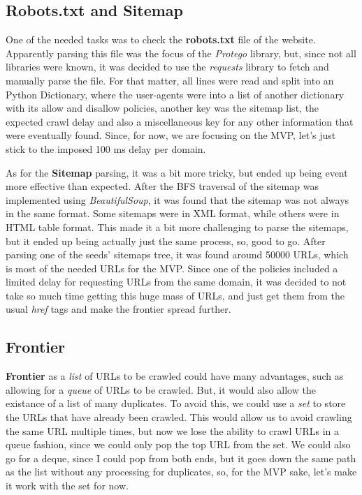 \subsection{Robots.txt and Sitemap}

One of the needed tasks was to check the \textbf{robots.txt} file of the website. Apparently parsing this file was the focus of the \textit{Protego} library, but, since not all libraries were known, it was decided to use the \textit{requests} library to fetch and manually parse the file. For that matter, all lines were read and split into an Python Dictionary, where the user-agents were into a list of another dictionary with its allow and disallow policies, another key was the sitemap list, the expected crawl delay and also a miscellaneous key for any other information that were eventually found. Since, for now, we are focusing on the MVP, let's just stick to the imposed 100 ms delay per domain.

As for the \textbf{Sitemap} parsing, it was a bit more tricky, but ended up being event more effective than expected. After the BFS traversal of the sitemap was implemented using \textit{BeautifulSoup}, it was found that the sitemap was not always in the same format. Some sitemaps were in XML format, while others were in HTML table format. This made it a bit more challenging to parse the sitemaps, but it ended up being actually just the same process, so, good to go. After parsing one of the seeds' sitemaps tree, it was found around 50000 URLs, which is most of the needed URLs for the MVP. Since one of the policies included a limited delay for requesting URLs from the same domain, it was decided to not take so much time getting this huge mass of URLs, and just get them from the usual \textit{href} tags and make the frontier spread further.

\subsection{Frontier}

\textbf{Frontier} as a \textit{list} of URLs to be crawled could have many advantages, such as allowing for a \textit{queue} of URLs to be crawled. But, it would also allow the existance of a list of many duplicates. To avoid this, we could use a \textit{set} to store the URLs that have already been crawled. This would allow us to avoid crawling the same URL multiple times, but now we lose the ability to crawl URLs in a queue fashion, since we could only pop the top URL from the set. We could also go for a deque, since I could pop from both ends, but it goes down the same path as the list without any processing for duplicates, so, for the MVP sake, let's make it work with the set for now.


